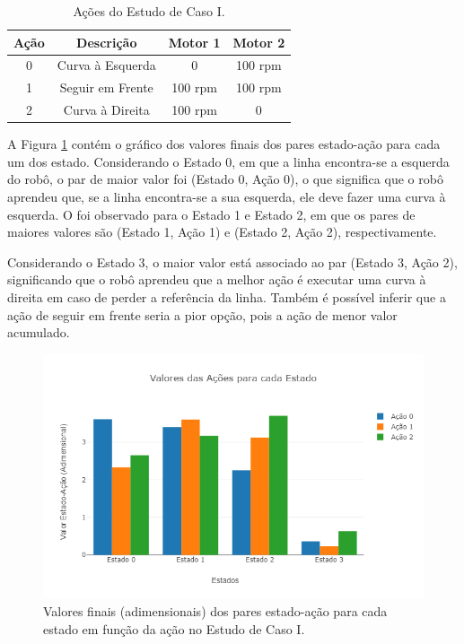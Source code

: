 \documentclass[a4paper]{ifacconf}
\begin{document}
\begin{table}[htb]
\centering
\caption{Ações do Estudo de Caso I.} \label{tab:basicActionsTab}
\begin{tabular}{cccc}
Ação & Descrição & Motor 1 & Motor 2\\ \hline
0 & Curva à Esquerda & 0 & 100 rpm\\ 
1 & Seguir em Frente & 100 rpm & 100 rpm\\ 
2 & Curva à Direita & 100 rpm & 0\\ \hline
\end{tabular}
\end{table}

A Figura \ref{fig:basic_chart1} contém o gráfico dos valores finais dos pares estado-ação para cada um dos estado. Considerando o Estado 0, em que a linha encontra-se a esquerda do robô, o par de maior valor foi (Estado 0, Ação 0), o que significa que o robô aprendeu que, se a linha encontra-se a sua esquerda, ele deve fazer uma curva à esquerda. O foi observado para o Estado 1 e Estado 2, em que os pares de maiores valores são (Estado 1, Ação 1) e (Estado 2, Ação 2), respectivamente. 

Considerando o Estado 3, o maior valor está associado ao par (Estado 3, Ação 2), significando que o robô aprendeu que a melhor ação é executar uma curva à direita em caso de perder a referência da linha. Também é possível inferir que a ação de seguir em frente seria a pior opção, pois a ação de menor valor acumulado. 

\begin{figure}
\centering 
\includegraphics[scale=0.35]{Figuras/basic_chart1.png}
\caption{Valores finais (adimensionais) dos pares estado-ação para cada estado em função da ação no Estudo de Caso I.} 
\label{fig:basic_chart1}
\end{figure}
\end{document}
